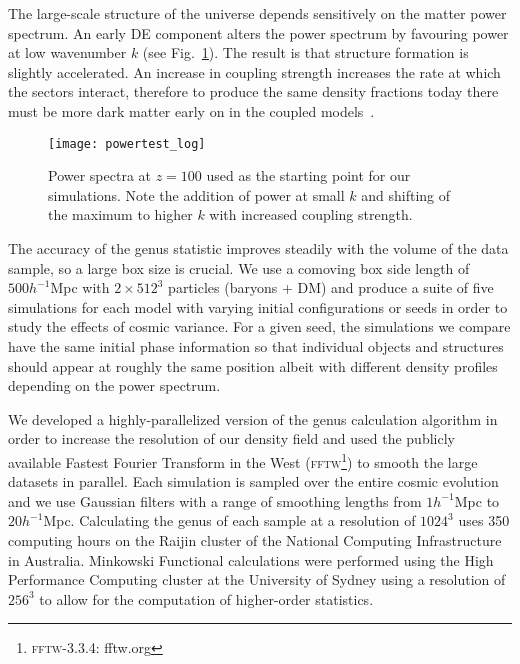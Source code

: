 \documentclass[a4paper,fleqn,usenatbib]{mnras}
\begin{document}
The large-scale structure of the universe depends sensitively on the matter power spectrum. An early DE component alters the power spectrum by favouring power at low wavenumber $k$ (see Fig.~\ref{fig:powspec}). The result is that structure formation is slightly accelerated. An increase in coupling strength increases the rate at which the sectors interact, therefore to produce the same density fractions today there must be more dark matter early on in the coupled models~\citep{2009PhRvD..80j3514X}.

\begin{figure}
	\texttt{[image: powertest\_log]}
    \caption{Power spectra at $z=100$ used as the starting point for our simulations. Note the addition of power at small $k$ and shifting of the maximum to higher $k$ with increased coupling strength. }
    \label{fig:powspec}
\end{figure}

The accuracy of the genus statistic improves steadily with the volume of the data sample, so a large box size is crucial. We use a comoving box side length of $500 h^{-1}$Mpc with $2 \times 512^3$ particles (baryons + DM) and produce a suite of five simulations for each model with varying initial configurations or seeds in order to study the effects of cosmic variance. For a given seed, the simulations we compare have the same initial phase information so that individual objects and structures should appear at roughly the same position albeit with different density profiles depending on the power spectrum.

We developed a highly-parallelized version of the genus calculation algorithm in order to increase the resolution of our density field and used the publicly available Fastest Fourier Transform in the West (\textsc{fftw}\footnote{\textsc{fftw-3.3.4}: fftw.org}) to smooth the large datasets in parallel. Each simulation is sampled over the entire cosmic evolution and we use Gaussian filters with a range of smoothing lengths from $1 h^{-1}$Mpc to $20 h^{-1}$Mpc. Calculating the genus of each sample at a resolution of $1024^3$ uses 350 computing hours on the Raijin cluster of the National Computing Infrastructure in Australia. Minkowski Functional calculations were performed using the High Performance Computing cluster at the University of Sydney using a resolution of $256^3$ to allow for the computation of higher-order statistics.
\end{document}
